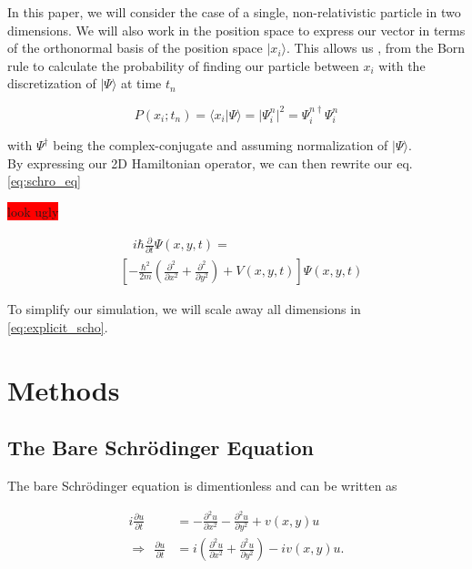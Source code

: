 \documentclass[english,notitlepage,reprint,nofootinbib]{revtex4-2}  %
\begin{document}
	In this paper, we will consider the case of a single, non-relativistic particle in two dimensions.
	We will also work in the position space to express our vector
	in terms of the orthonormal basis of the position space $|x_i\rangle$. This allows us
	, from the Born rule to calculate the probability of finding our particle between
	$x_i$ with the discretization of  $|\Psi\rangle$  at time $t_n$

	\begin{equation}
		P(x_i;t_n) = \langle x_i |\Psi\rangle = |\Psi^n_i|^2 =  \Psi^{n\dagger}_i\Psi^n_i
	\end{equation}

	with $\Psi^\dagger$ being the complex-conjugate and assuming normalization of $
	|\Psi\rangle$. \\

	By expressing our 2D Hamiltonian operator, we can then rewrite our eq. \ref{eq:schro_eq}


	\colorbox{red}{look ugly}

	\begin{align*}
		& \quad i \hbar \frac{\partial}{\partial t} \Psi(x, y, t)= \\
		& \left[-\frac{\hbar^{2}}{2 m}\left(\frac{\partial^{2}}{\partial x^{2}}+\frac{\partial^{2}}{\partial y^{2}}\right)+V(x, y, t)\right] \Psi(x, y, t) \tag{2} \label{eq:explicit_scho}
	\end{align*}


	To simplify our simulation, we will scale away all dimensions in \eqref{eq:explicit_scho}.
	
	\section{Methods}\label{sec:methods}
	\subsection{The Bare Schrödinger Equation}
	The bare Schrödinger equation is dimentionless and can be written as 

	\begin{equation}\label{eq:bare Schrodinger}
		\begin{split}
		i \frac{\partial u}{\partial t} &= -\frac{\partial^2 u}{\partial x^2} - \frac{\partial^2 u}{\partial y^2} + v(x,y) u\\
		\Rightarrow \ \ \frac{\partial u}{\partial t} &= i\left(\frac{\partial^2 u}{\partial x^2} + \frac{\partial^2 u}{\partial y^2}\right) - iv(x,y) u.
		\end{split}
	\end{equation} 
	
\end{document}
